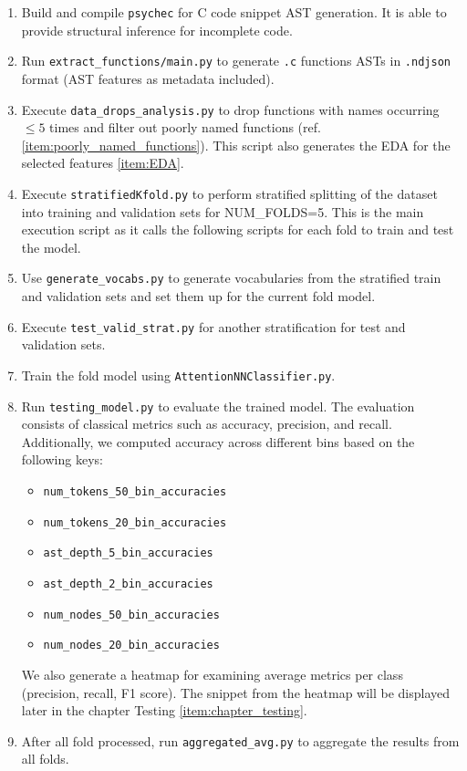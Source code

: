 \documentclass[10pt,english,a4paper]{report}
\begin{document}
 \begin{enumerate}
    \item Build and compile \texttt{psychec} for C code snippet AST generation. It is able to provide structural inference for incomplete code.

    \item Run \texttt{extract\_functions/main.py} to generate \texttt{.c} functions ASTs in \texttt{.ndjson} format (AST features as metadata included).

    \item Execute \texttt{data\_drops\_analysis.py} to drop functions with names occurring $\leq 5$ times and filter out poorly named functions (ref. \ref{item:poorly_named_functions}). 
    This script also generates the EDA for the selected features \ref{item:EDA}.

    \item Execute \texttt{stratifiedKfold.py} to perform stratified splitting of the dataset into training and validation sets for NUM\_FOLDS=5. This is the main execution
    script as it calls the following scripts for each fold to train and test the model.
    
    \item Use \texttt{generate\_vocabs.py} to generate vocabularies from the stratified train and validation sets and set them up for the current fold model.

    \item Execute \texttt{test\_valid\_strat.py} for another stratification for test and validation sets.

    \item Train the fold model using \texttt{AttentionNNClassifier.py}.

    \item Run \texttt{testing\_model.py} to evaluate the trained model. The evaluation consists of 
    classical metrics such as accuracy, precision, and recall. Additionally, we computed accuracy across 
    different bins based on the following keys:
    
    \begin{itemize}
        \item \texttt{num\_tokens\_50\_bin\_accuracies}
        \item \texttt{num\_tokens\_20\_bin\_accuracies}
        \item \texttt{ast\_depth\_5\_bin\_accuracies}
        \item \texttt{ast\_depth\_2\_bin\_accuracies}
        \item \texttt{num\_nodes\_50\_bin\_accuracies}
        \item \texttt{num\_nodes\_20\_bin\_accuracies}
    \end{itemize}

    We also generate a heatmap for examining average metrics per class (precision, recall, F1 score). The snippet from the heatmap will be displayed later in the chapter Testing \ref{item:chapter_testing}.


    \item After all fold processed, run \texttt{aggregated\_avg.py} to aggregate the results from all folds. 
\end{enumerate}
\end{document}
